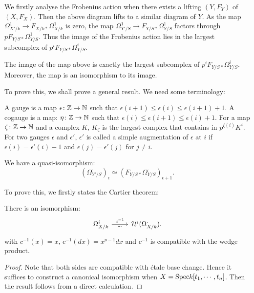 We firstly analyse the Frobenius action when there exists a lifting $(Y,F_Y)$ of $(X,F_X)$. 
Then the above diagram lifts to a similar diagram of $Y$. 
As the map $\Omega_{X'/k}^1 \to F_{X/k*} \Omega_{X/k}^1$ is zero, 
the map $\Omega_{Y'/S}^1 \to F_{Y/S*} \Omega_{Y/S}^1$ 
factors through $p F_{Y/S*} \Omega_{Y/S}^1$. 
Thus the image of the Frobenius action 
lies in the largest subcomplex of $p^iF_{Y/S*} \Omega_{Y/S}^i$. 

\begin{proposition}
    The image of the map above is exactly 
    the largest subcomplex of $p^i F_{Y/S*} \Omega_{Y/S}^i$. 
    Moreover, the map is an isomorphism to its image.
\end{proposition}

To prove this, we shall prove a general result. 
We need some terminology:
\begin{definition}
    A gauge is a map $\epsilon \colon {\mathbb {Z}} \to {\mathbb {N}}$ 
    such that $\epsilon(i + 1) \leq \epsilon(i) \leq \epsilon(i + 1) + 1$. 
    A cogauge is a map: $\eta \colon {\mathbb {Z}} \to {\mathbb {N}}$ 
    such that $\epsilon(i) \leq \epsilon(i + 1) \leq \epsilon(i) + 1$. 
    For a map $\zeta \colon {\mathbb {Z}} \to {\mathbb {N}}$ and a complex $K$, 
    $K_\zeta$ is the largest complex that contains in $p^{\zeta(i)} K^i$. 
    For two gauges $\epsilon$ and $\epsilon'$, 
    $\epsilon'$ is called a simple augmentation of $\epsilon$ at $i$ 
    if $\epsilon(i) = \epsilon'(i) - 1$ and $\epsilon(j) = \epsilon'(j)$ for $j \neq i$. 
\end{definition}

\begin{proposition}
    We have a quasi-isomorphism:
    \[
        (\Omega_{Y'/S}^\cdot)_\epsilon 
        \simeq (F_{Y/S*} \Omega_{Y/S}^\cdot)_{\epsilon + 1}.
    \]
\end{proposition}

To prove this, we firstly states the Cartier theorem:
\begin{proposition}
    There is an isomorphism:
    \[
        \begin{tikzcd}
            \Omega_{X/k}^i \ar[r, "{\sim}"swap, "{c^{-1}}"] 
            & \CH^i (\Omega_{X/k}^\cdot).
        \end{tikzcd}
    \]
    with $c^{-1}(x) = x$, $c^{-1}(dx) = x^{p-1} dx$ 
    and $c^{-1}$ is compatible with the wedge product.
\end{proposition}

\begin{proof}
    Note that both sides are compatible with \'etale base change.
    Hence it suffices to construct a canonical isomorphism when 
    $X = \mathrm{Spec} k[t_1, \cdots, t_n]$. 
    Then the result follows from a direct calculation.
\end{proof}


